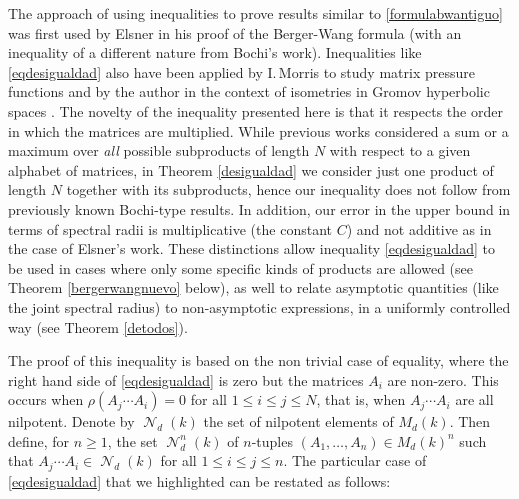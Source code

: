 \documentclass[JEP,XML,SOM,Unicode,NoEqCountersInSection]{cedram}
\let\mathcal\mathscr
\theoremstyle{plain}
\theoremstyle{definition}
\DeclareMathOperator{\Nil}{\mathcal{N}}
\begin{document}
The approach of using inequalities to prove results similar to \eqref{formulabwantiguo} was first used by Elsner \cite{elsner} in his proof of the Berger-Wang formula (with an inequality of a different nature from Bochi's work). Inequalities like \eqref{eqdesigualdad} also have been applied by I.\,Morris to study matrix pressure functions \cite{morrispr} and by the author in the context of isometries in Gromov hyperbolic spaces \cite{yo}. The novelty of the inequality presented here is that it respects the order in which the matrices are multiplied. While previous works considered a sum or a maximum over \textit{all} possible subproducts of length $N$ with respect to a given alphabet of matrices, in Theorem \ref{desigualdad} we consider just one product of length $N$ together with its subproducts, hence our inequality does not follow from previously known Bochi-type results. In addition, our error in the upper bound in terms of spectral radii is multiplicative (the constant $C$) and not additive as in the case of Elsner's work. These distinctions allow inequality \eqref{eqdesigualdad} to be used in cases where only some specific kinds of products are allowed (see Theorem \ref{bergerwangnuevo} below), as well to relate asymptotic quantities (like the joint spectral radius) to non-asymptotic expressions, in a uniformly controlled way (see Theorem \ref{detodos}).

The proof of this inequality is based on the non trivial case of equality, where the right hand side of \eqref{eqdesigualdad} is zero but the matrices $A_i$ are non-zero. This occurs when $\rho(A_{j}\cdots A_{i})=0$ for all $1\leq i \leq j \leq N$, that is, when $A_{j}\cdots A_{i}$ are all nilpotent. Denote by $\Nil_{d}(k)$ the set of nilpotent elements of $M_{d}(k)$. Then define, for $n\geq 1$, the set $\Nil_{d}^{n}(k)$ of $n$-tuples $(A_1,\dots,A_n)\in {M_{d}(k)}^{n}$ such that $A_{j}\cdots A_{i}\in \Nil_{d}(k)$ for all $1\leq i \leq j \leq n$.
The particular case of \eqref{eqdesigualdad} that we highlighted can be restated as follows:
\end{document}
